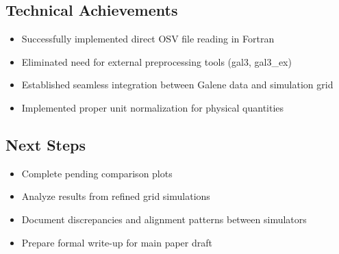 \documentclass{article}
\begin{document}
\subsection{Technical Achievements}
\begin{itemize}
    \item Successfully implemented direct OSV file reading in Fortran
    \item Eliminated need for external preprocessing tools (gal3, gal3\_ex)
    \item Established seamless integration between Galene data and simulation grid
    \item Implemented proper unit normalization for physical quantities
\end{itemize}

\subsection{Next Steps}
\begin{itemize}
    \item Complete pending comparison plots
    \item Analyze results from refined grid simulations
    \item Document discrepancies and alignment patterns between simulators
    \item Prepare formal write-up for main paper draft
\end{itemize}
\end{document}
